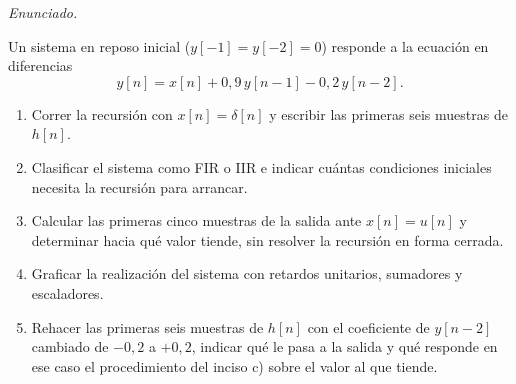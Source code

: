 \documentclass[10pt,a4paper]{article}
\newenvironment{consigna}{%
  \par\smallskip
  \def\FrameCommand{\textcolor{utnblue!35}{\vrule width 2pt}\hspace{10pt}}%
  \MakeFramed{\advance\hsize-\width \FrameRestore}%
  \small\noindent\textit{Enunciado.}\enspace\ignorespaces
}{\endMakeFramed\par\smallskip}
\begin{document}
	\begin{consigna}
	Un sistema en reposo inicial ($y[-1]=y[-2]=0$) responde a la ecuación en
	diferencias
	\[
		y[n] = x[n] + 0{,}9\,y[n-1] - 0{,}2\,y[n-2].
	\]
	\begin{enumerate}
		\item Correr la recursión con $x[n]=\delta[n]$ y escribir las
		primeras seis muestras de $h[n]$.
		\item Clasificar el sistema como FIR o IIR e indicar cuántas
		condiciones iniciales necesita la recursión para arrancar.
		\item Calcular las primeras cinco muestras de la salida ante
		$x[n]=u[n]$ y determinar hacia qué valor tiende, sin resolver la
		recursión en forma cerrada.
		\item Graficar la realización del sistema con retardos unitarios,
		sumadores y escaladores.
		\item Rehacer las primeras seis muestras de $h[n]$ con el
		coeficiente de $y[n-2]$ cambiado de $-0{,}2$ a $+0{,}2$, indicar
		qué le pasa a la salida y qué responde en ese caso el
		procedimiento del inciso c) sobre el valor al que tiende.
	\end{enumerate}
	\end{consigna}
\end{document}
